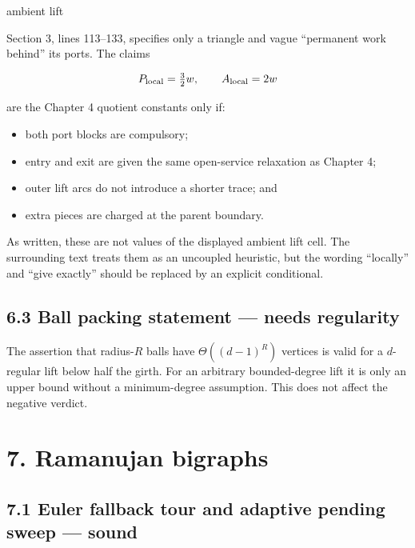 \documentclass[11pt,a4paper]{article}
\begin{document}
ambient lift


Section 3, lines 113–133, specifies only a triangle and vague “permanent work behind” its ports.  The claims


\[
 P_{\rm local}=\tfrac32w,\qquad A_{\rm local}=2w
\]

are the Chapter 4 quotient constants only if:


\begin{itemize}

\item both port blocks are compulsory;

\item entry and exit are given the same open-service relaxation as Chapter 4;

\item outer lift arcs do not introduce a shorter trace; and

\item extra pieces are charged at the parent boundary.

\end{itemize}

As written, these are not values of the displayed ambient lift cell.  The surrounding text treats them as an uncoupled heuristic, but the wording “locally” and “give exactly” should be replaced by an explicit conditional.


\subsection*{6.3 Ball packing statement — needs regularity}

The assertion that radius-\(R\) balls have \(\Theta((d-1)^R)\) vertices is valid for a \(d\)-regular lift below half the girth.  For an arbitrary bounded-degree lift it is only an upper bound without a minimum-degree assumption.  This does not affect the negative verdict.


\section*{7. Ramanujan bigraphs}

\subsection*{7.1 Euler fallback tour and adaptive pending sweep — sound}
\end{document}
